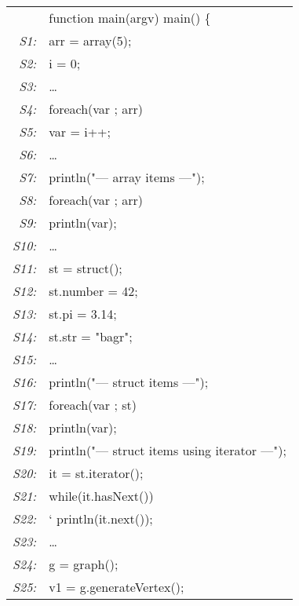 \begin{figure}
\begin{center}
      {\small \tt
        \begin{tabular}[b]{rl}
          &function main(argv) main() \{ \\
	  {\em \scriptsize S1:}&  \quad  arr = array(5);\\
	  {\em \scriptsize S2:}&  \quad  i = 0;\\
	  {\em \scriptsize S3:}&  \quad  \ldots\\
	  {\em \scriptsize S4:}&  \quad  foreach(var ; arr)\\
	  {\em \scriptsize S5:}&  \quad \quad 	var = i++;\\
	  {\em \scriptsize S6:}&  \quad  \ldots\\
	  {\em \scriptsize S7:}&  \quad  println("--- array items ---");\\
	  {\em \scriptsize S8:}&  \quad  foreach(var ; arr)\\
	  {\em \scriptsize S9:}&  \quad \quad  	println(var);\\
	  {\em \scriptsize S10:}&  \quad  \ldots\\
	  {\em \scriptsize S11:}&  \quad  st = struct();\\
	  {\em \scriptsize S12:}&  \quad  st.number = 42;\\
	  {\em \scriptsize S13:}&  \quad  st.pi = 3.14;\\
	  {\em \scriptsize S14:}&  \quad  st.str = "bagr";\\
	  {\em \scriptsize S15:}&  \quad  \ldots\\
	  {\em \scriptsize S16:}&  \quad  println("--- struct items ---");\\
	  {\em \scriptsize S17:}&  \quad  foreach(var ; st)\\
	  {\em \scriptsize S18:}&  \quad \quad  	println(var);\\
	  {\em \scriptsize S19:}&  \quad  println("--- struct items using iterator ---");\\
	  {\em \scriptsize S20:}&  \quad  it = st.iterator();\\
	  {\em \scriptsize S21:}&  \quad  while(it.hasNext())\\
	  {\em \scriptsize S22:}&  \quad  \quad`	println(it.next());\\
	  {\em \scriptsize S23:}&  \quad  \ldots\\
	  {\em \scriptsize S24:}&  \quad  g = graph();\\
	  {\em \scriptsize S25:}&  \quad  v1 = g.generateVertex();\\

\end{tabular}}
\end{center}
\end{figure}
